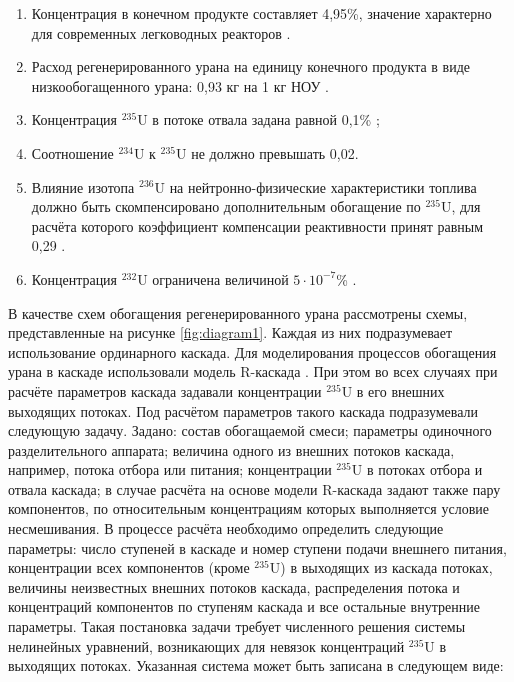 \begin{enumerate}
  \item Концентрация в конечном продукте составляет 4,95\%, значение характерно для современных легководных реакторов \cite{solovevaCennostiOYaTKak2019}.
  \item Расход регенерированного урана на единицу конечного продукта в виде низкообогащенного урана: 0,93 кг на 1 кг НОУ \cite{smirnovApplyingEnrichmentCapacities2018}.
  \item Концентрация $^{235}$U в потоке отвала задана равной 0,1\% \cite{smirnovEvolutionIsotopicComposition2012};
  \item Соотношение $^{234}$U к $^{235}$U не должно превышать 0,02.
  \item Влияние изотопа $^{236}$U на нейтронно-физические характеристики топлива должно быть скомпенсировано дополнительным обогащение по $^{235}$U, для расчёта которого коэффициент компенсации реактивности принят равным 0,29 \cite{smirnovApplyingEnrichmentCapacities2018}.
  \item Концентрация $^{232}$U ограничена величиной $5\cdot10^{-7}$\% \cite{smirnovApplyingEnrichmentCapacities2018}.
\end{enumerate}

В качестве схем обогащения регенерированного урана рассмотрены схемы, представленные на рисунке \ref{fig:diagram1}.
Каждая из них подразумевает использование ординарного каскада. Для моделирования процессов обогащения урана в каскаде использовали модель R-каскада \cite{sulaberidzeTeoriyaKaskadovDlya2011}. При этом во всех случаях при расчёте параметров каскада задавали концентрации $^{235}$U в его внешних выходящих потоках. Под расчётом параметров такого каскада подразумевали следующую задачу. 
Задано: состав обогащаемой смеси; параметры одиночного разделительного аппарата; величина одного из внешних потоков каскада, например, потока отбора или питания; концентрации $^{235}$U в потоках отбора и отвала каскада; в случае расчёта на основе модели R-каскада задают также пару компонентов, по относительным концентрациям которых выполняется условие несмешивания.
В процессе расчёта необходимо определить следующие параметры: число ступеней в каскаде и номер ступени подачи внешнего питания, концентрации всех компонентов (кроме $^{235}$U) в выходящих из каскада потоках, величины неизвестных внешних потоков каскада, распределения потока и концентраций компонентов по ступеням каскада и все остальные внутренние параметры. 
Такая постановка задачи требует численного решения системы нелинейных уравнений, возникающих для невязок концентраций $^{235}$U в выходящих потоках. Указанная система может быть записана в следующем виде: 

